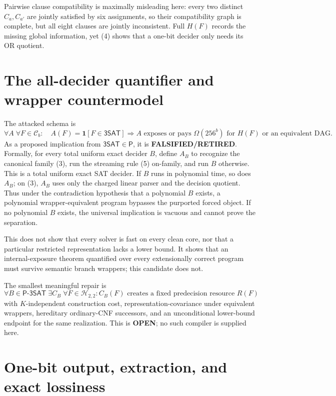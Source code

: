 \documentclass[11pt]{article}
\newcommand{\SAT}{\mathsf{3SAT}}
\newcommand{\OPEN}{\textbf{OPEN}}
\newcommand{\RETIRED}{\textbf{FALSIFIED/RETIRED}}
\begin{document}
Pairwise clause compatibility is maximally misleading here: every two
distinct $C_a,C_{a'}$ are jointly satisfied by six assignments, so their
compatibility graph is complete, but all eight clauses are jointly
inconsistent.  Full $H(F)$ records the missing global information, yet (4)
shows that a one-bit decider only needs its OR quotient.

\section{The all-decider quantifier and wrapper countermodel}

The attacked schema is
\[
\tag{SEMANTIC-STATE-FORCES-WORK1}
\forall A\;\forall F\in\mathcal C_b:\quad
A(F)=\mathbf1[F\in\SAT]
\Longrightarrow
A\text{ exposes or pays }\Omega(256^b)
\text{ for }H(F)\text{ or an equivalent DAG}.
\]
As a proposed implication from $\SAT\in\mathsf P$, it is \RETIRED.
Formally, for every total uniform exact decider $B$, define $A_B$ to
recognize the canonical family (3), run the streaming rule (5) on-family,
and run $B$ otherwise.  This is a total uniform exact SAT decider.  If $B$
runs in polynomial time, so does $A_B$; on (3), $A_B$ uses only the charged
linear parser and the decision quotient.  Thus under the contradiction
hypothesis that a polynomial $B$ exists, a polynomial wrapper-equivalent
program bypasses the purported forced object.  If no polynomial $B$ exists,
the universal implication is vacuous and cannot prove the separation.

This does not show that every solver is fast on every clean core, nor that a
particular restricted representation lacks a lower bound.  It shows that an
internal-exposure theorem quantified over every extensionally correct
program must survive semantic branch wrappers; this candidate does not.

The smallest meaningful repair is
\[
\tag{QUOTIENT-RESISTANT-COMPILER1}
\forall B\in\mathsf{P}\text{-}\SAT\;\exists C_B\;\forall F\in\mathcal H_{2,2}:
C_B(F)\text{ creates a fixed predecision resource }R(F)
\]
with $K$-independent construction cost, representation-covariance under
equivalent wrappers, hereditary ordinary-CNF successors, and an
unconditional lower-bound endpoint for the same realization.  This is
\OPEN; no such compiler is supplied here.

\section{One-bit output, extraction, and exact lossiness}
\end{document}
